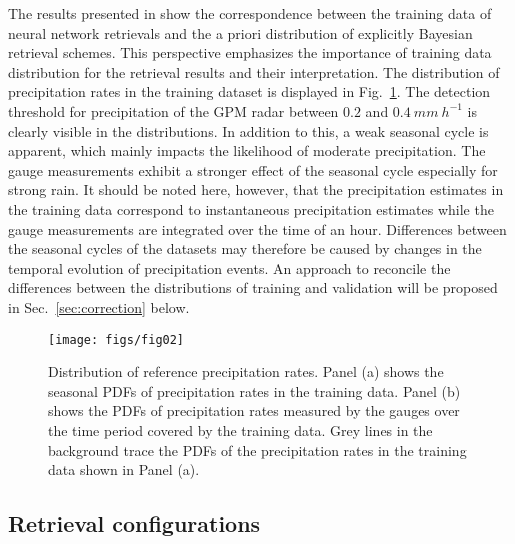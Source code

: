 \documentclass[journal abbreviation, manuscript]{copernicus}
\begin{document}
The results presented in \citet{pfreundschuh18} show the correspondence between
the training data of neural network retrievals and the a priori distribution of
explicitly Bayesian retrieval schemes. This perspective emphasizes the
importance of training data distribution for the retrieval results and their
interpretation. The distribution of precipitation rates in the training dataset
is displayed in Fig.~\ref{fig:training_data}. The detection threshold for
precipitation of the GPM radar between $0.2$ and $0.4\ \unit{mm \ h^{-1}}$ is
clearly visible in the distributions. In addition to this, a weak seasonal cycle
is apparent, which mainly impacts the likelihood of moderate precipitation. The
gauge measurements exhibit a stronger effect of the seasonal cycle especially
for strong rain. It should be noted here, however, that the precipitation
estimates in the training data correspond to instantaneous precipitation
estimates while the gauge measurements are integrated over the time of an hour.
Differences between the seasonal cycles of the datasets may therefore be caused
by changes in the temporal evolution of precipitation events. An approach to
reconcile the differences between the distributions of training and validation
will be proposed in Sec.~\ref{sec:correction} below.


\begin{figure}
  \centering
  \texttt{[image: figs/fig02]}
  \caption{
    Distribution of reference precipitation rates. Panel (a) shows the
    seasonal PDFs of precipitation rates in the training data. Panel (b)
    shows the PDFs of precipitation rates measured by the gauges
    over the time period covered by the training data. Grey lines in the
    background trace the PDFs of the precipitation rates in the training data
    shown in Panel (a).
    }
  \label{fig:training_data}
\end{figure}


\subsection{Retrieval configurations}
\end{document}
